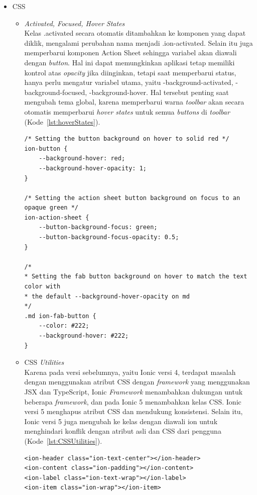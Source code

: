 \begin{enumerate}
	\begin{itemize}
		\item CSS
		\begin{itemize}
			\item {\it Activated, Focused, Hover States} \\
			Kelas .activated secara otomatis ditambahkan ke komponen yang dapat diklik, mengalami perubahan nama menjadi .ion-activated. Selain itu juga memperbarui komponen Action Sheet sehingga variabel akan diawali dengan {\it button}. Hal ini dapat memungkinkan aplikasi tetap memiliki kontrol atas {\it opacity} jika diinginkan, tetapi saat memperbarui status, hanya perlu mengatur variabel utama, yaitu -background-activated, -background-focused, -background-hover. Hal tersebut penting saat mengubah tema global, karena memperbarui warna {\it toolbar} akan secara otomatis memperbarui {\it hover states} untuk semua {\it buttons} di {\it toolbar} (Kode~\ref{lst:hoverStates}). 		
			
		\begin{lstlisting}[label={lst:hoverStates}, caption=Contoh Kode {\it Hover States} pada Ionic 5]
/* Setting the button background on hover to solid red */
ion-button {
	--background-hover: red;
	--background-hover-opacity: 1;
}

/* Setting the action sheet button background on focus to an opaque green */
ion-action-sheet {
	--button-background-focus: green;
	--button-background-focus-opacity: 0.5;
}

/*
* Setting the fab button background on hover to match the text color with
* the default --background-hover-opacity on md
*/
.md ion-fab-button {
	--color: #222;
	--background-hover: #222;
}
		\end{lstlisting} 
		\newpage
			\item CSS {\it Utilities} \\
			Karena pada versi sebelumnya, yaitu Ionic versi 4, terdapat masalah dengan menggunakan atribut CSS dengan {\it framework} yang menggunakan JSX dan TypeScript, Ionic {\it Framework} menambahkan dukungan untuk beberapa {\it framework}, dan pada Ionic 5 menambahkan kelas CSS. Ionic versi 5 menghapus atribut CSS dan mendukung konsistensi. Selain itu, Ionic versi 5 juga mengubah ke kelas dengan diawali ion untuk menghindari konflik dengan atribut asli dan CSS dari pengguna (Kode~\ref{lst:CSSUtilities}).		
			
		\begin{lstlisting}[label={lst:CSSUtilities}, caption=Contoh Kode Kelas CSS {\it Utility} pada Ionic 5]
<ion-header class="ion-text-center"></ion-header>
<ion-content class="ion-padding"></ion-content>
<ion-label class="ion-text-wrap"></ion-label>
<ion-item class="ion-wrap"></ion-item>
		\end{lstlisting} 
  

\end{itemize}
\end{itemize}
\end{enumerate}
